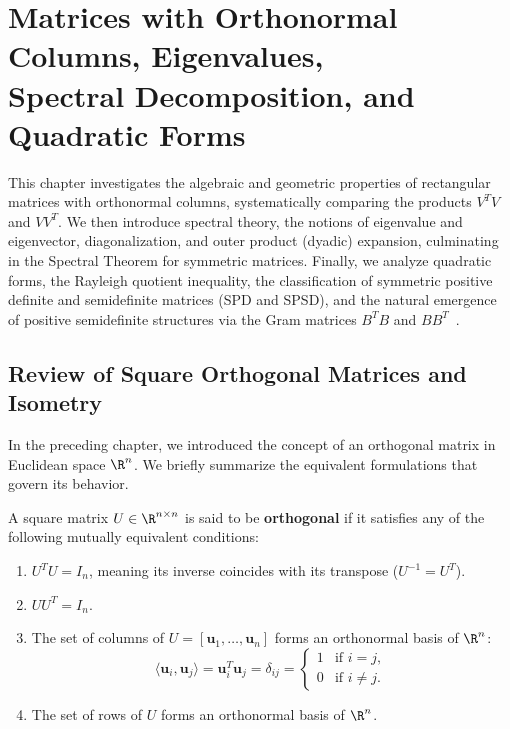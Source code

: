 \chapter[Orthonormal Matrices, Eigenvalues, and Quadratic Forms]{Matrices with Orthonormal Columns, Eigenvalues,\\Spectral Decomposition, and Quadratic Forms}
\label{chap:orthonormal-matrices-eigenvalues-quadratic-forms}

This chapter investigates the algebraic and geometric properties of rectangular matrices with orthonormal columns, systematically comparing the products $V^T V$ and $V V^T$. We then introduce spectral theory, the notions of eigenvalue and eigenvector, diagonalization, and outer product (dyadic) expansion, culminating in the Spectral Theorem for symmetric matrices. Finally, we analyze quadratic forms, the Rayleigh quotient inequality, the classification of symmetric positive definite and semidefinite matrices (SPD and SPSD), and the natural emergence of positive semidefinite structures via the Gram matrices $B^T B$ and $B B^T$~\cite{trefethen1997numerical}.

\FloatBarrier
\section{Review of Square Orthogonal Matrices and Isometry}

In the preceding chapter, we introduced the concept of an orthogonal matrix in Euclidean space $\R^n$. We briefly summarize the equivalent formulations that govern its behavior.

\begin{definition}
\label{def:square-orthogonal-recap}
A square matrix $U \in \R^{n \times n}$ is said to be \textbf{orthogonal} if it satisfies any of the following mutually equivalent conditions:
\begin{enumerate}
    \item $U^T U = I_n$, meaning its inverse coincides with its transpose ($U^{-1} = U^T$).
    \item $U U^T = I_n$.
    \item The set of columns of $U = [\mathbf{u}_1, \dots, \mathbf{u}_n]$ forms an orthonormal basis of $\R^n$:
    \begin{equation}
        \langle \mathbf{u}_i, \mathbf{u}_j \rangle = \mathbf{u}_i^T \mathbf{u}_j = \delta_{ij} = \begin{cases} 1 & \text{if } i = j, \\ 0 & \text{if } i \neq j. \end{cases}
    \end{equation}
    \item The set of rows of $U$ forms an orthonormal basis of $\R^n$.
\end{enumerate}
\end{definition}

